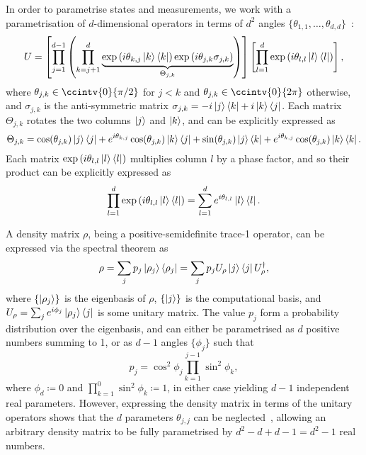 \documentclass[10pt, a4paper]{article}
\numberwithin{equation}{section} %
\theoremstyle{definition}
\theoremstyle{plain}
\newcommand{\?}{\mathrel{?}} %
\begin{document}
                  In order to parametrise states and measurements, we work with a parametrisation of \(d\)-dimensional operators in terms of \(d^2\) angles \(\{\theta_{1,1},\ldots,\theta_{d,d}\}\)~\cite{CompositeParam}:
                  \begin{equation}
                    U = \left[ \prod_{j=1}^{d-1} \left(\prod_{k={j+1}}^d \underbrace{\exp\left(i\theta_{k,j}\ket{k}\bra{k}\right)\exp\left(i\theta_{j,k}\sigma_{j,k}\right)}_{\Theta_{j,k}} \right) \right] \left[ \prod_{l=1}^d \exp\left(i\theta_{l,l}\ket{l}\bra{l}\right) \right],
                  \end{equation}
                  where \(\theta_{j,k} \in \ccintv{0}{\pi/2}\) for \(j<k\) and \(\theta_{j,k} \in \ccintv{0}{2\pi}\) otherwise, and \(\sigma_{j,k}\) is the anti-symmetric matrix \(\sigma_{j,k} = -i\ket{j}\bra{k} +i\ket{k}\bra{j}\). Each matrix \(\Theta_{j,k}\) rotates the two columns \(\ket{j}\) and \(\ket{k}\), and can be explicitly expressed as
                  \begin{equation}
                    \Theta_{j,k} = \cos(\theta_{j,k})\ket{j}\bra{j} + e^{i\theta_{k,j}}\cos(\theta_{j,k})\ket{k}\bra{j} + \sin(\theta_{j,k})\ket{j}\bra{k} + e^{i\theta_{k,j}}\cos(\theta_{j,k})\ket{k}\bra{k}.
                  \end{equation}
                  Each matrix \(\exp\left(i\theta_{l,l}\ket{l}\bra{l}\right)\) multiplies column \(l\) by a phase factor, and so their product can be explicitly expressed as
                  \begin{equation}
                    \prod_{l=1}^d \exp\left(i\theta_{l,l}\ket{l}\bra{l}\right) = \sum_{l=1}^d e^{i\theta_{l,l}}\ket{l}\bra{l}.
                  \end{equation}

                  A density matrix \(\rho\), being a positive-semidefinite trace-1 operator, can be expressed via the spectral theorem as
                  \begin{equation}
                    \rho = \sum_j p_j \ket{\rho_j}\bra{\rho_j} = \sum_j p_j U_{\rho}\ket{j}\bra{j}U_{\rho}^{\dagger},
                  \end{equation}
                  where \(\{\ket{\rho_j}\}\) is the eigenbasis of \(\rho\), \(\{\ket{j}\}\) is the computational basis, and \(U_{\rho} = \sum_{j} e^{i\phi_j} \ket{\rho_j}\bra{j}\) is some unitary matrix. The value \(p_j\) form a probability distribution over the eigenbasis, and can either be parametrised as \(d\) positive numbers summing to 1, or as \(d-1\) angles \(\{\phi_j\}\) such that
                  \begin{equation}
                    p_j = \cos^2\phi_j\prod_{k=1}^{j-1}\sin^2\phi_k,
                  \end{equation}
                  where \(\phi_d \coloneqq 0\) and \(\prod_{k=1}^{0}\sin^2\phi_k \coloneqq 1\), in either case yielding \(d-1\) independent real parameters. However, expressing the density matrix in terms of the unitary operators shows that the \(d\) parameters \(\theta_{j,j}\) can be neglected~\cite{CompositeParam}, allowing an arbitrary density matrix to be fully parametrised by \(d^2 -d + d - 1 = d^2-1\) real numbers.
\end{document}
